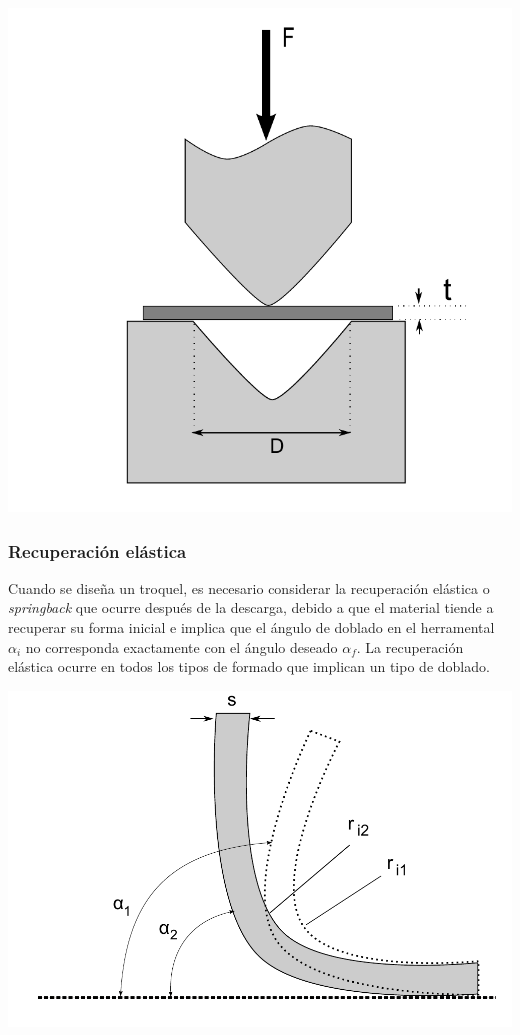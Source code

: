 \begin{center}
\includegraphics[scale=0.4]{src/ch2/fuerza_doblado}
\label{fig:fuerza_doblado}
\end{center}


\subsubsection{Recuperación elástica}

Cuando se diseña un troquel, es necesario considerar la recuperación elástica o \textit{springback} 
que ocurre después de la descarga, debido a que el material tiende a recuperar su forma 
inicial e implica que el ángulo de doblado en el herramental $\alpha_i$ no corresponda exactamente con el 
ángulo deseado $\alpha_f$. La recuperación elástica ocurre en todos los tipos de formado 
que implican un tipo de doblado.\\

\begin{center}
\includegraphics[scale=0.4]{src/ch2/springback}
\label{fig:springback}
\end{center}

